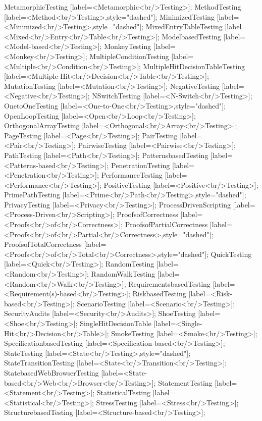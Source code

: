 \documentclass{article}
\begin{document}
{MetamorphicTesting [label=<Metamorphic<br/>Testing>];
MethodTesting [label=<Method<br/>Testing>,style="dashed"];
MinimizedTesting [label=<Minimized<br/>Testing>,style="dashed"];
MixedEntryTableTesting [label=<Mixed<br/>Entry<br/>Table<br/>Testing>];
ModelbasedTesting [label=<Model-based<br/>Testing>];
MonkeyTesting [label=<Monkey<br/>Testing>];
MultipleConditionTesting [label=<Multiple<br/>Condition<br/>Testing>];
MultipleHitDecisionTableTesting [label=<Multiple-Hit<br/>Decision<br/>Table<br/>Testing>];
MutationTesting [label=<Mutation<br/>Testing>];
NegativeTesting [label=<Negative<br/>Testing>];
NSwitchTesting [label=<N-Switch<br/>Testing>];
OnetoOneTesting [label=<One-to-One<br/>Testing>,style="dashed"];
OpenLoopTesting [label=<Open<br/>Loop<br/>Testing>];
OrthogonalArrayTesting [label=<Orthogonal<br/>Array<br/>Testing>];
PageTesting [label=<Page<br/>Testing>];
PairTesting [label=<Pair<br/>Testing>];
PairwiseTesting [label=<Pairwise<br/>Testing>];
PathTesting [label=<Path<br/>Testing>];
PatternsbasedTesting [label=<Patterns-based<br/>Testing>];
PenetrationTesting [label=<Penetration<br/>Testing>];
PerformanceTesting [label=<Performance<br/>Testing>];
PositiveTesting [label=<Positive<br/>Testing>];
PrimePathTesting [label=<Prime<br/>Path<br/>Testing>,style="dashed"];
PrivacyTesting [label=<Privacy<br/>Testing>];
ProcessDrivenScripting [label=<Process-Driven<br/>Scripting>];
ProofsofCorrectness [label=<Proofs<br/>of<br/>Correctness>];
ProofsofPartialCorrectness [label=<Proofs<br/>of<br/>Partial<br/>Correctness>,style="dashed"];
ProofsofTotalCorrectness [label=<Proofs<br/>of<br/>Total<br/>Correctness>,style="dashed"];
QuickTesting [label=<Quick<br/>Testing>];
RandomTesting [label=<Random<br/>Testing>];
RandomWalkTesting [label=<Random<br/>Walk<br/>Testing>];
RequirementsbasedTesting [label=<Requirement(s)-based<br/>Testing>];
RiskbasedTesting [label=<Risk-based<br/>Testing>];
ScenarioTesting [label=<Scenario<br/>Testing>];
SecurityAudits [label=<Security<br/>Audits>];
ShoeTesting [label=<Shoe<br/>Testing>];
SingleHitDecisionTable [label=<Single-Hit<br/>Decision<br/>Table>];
SmokeTesting [label=<Smoke<br/>Testing>];
SpecificationbasedTesting [label=<Specification-based<br/>Testing>];
StateTesting [label=<State<br/>Testing>,style="dashed"];
StateTransitionTesting [label=<State<br/>Transition<br/>Testing>];
StatebasedWebBrowserTesting [label=<State-based<br/>Web<br/>Browser<br/>Testing>];
StatementTesting [label=<Statement<br/>Testing>];
StatisticalTesting [label=<Statistical<br/>Testing>];
StressTesting [label=<Stress<br/>Testing>];
StructurebasedTesting [label=<Structure-based<br/>Testing>];
}
\end{document}
